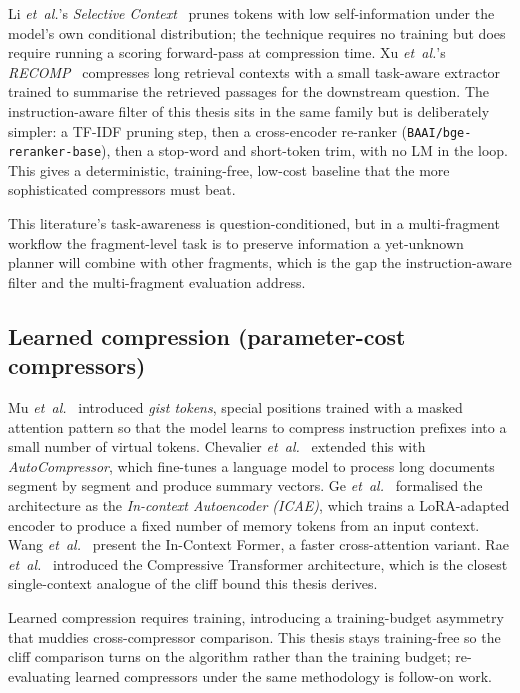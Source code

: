 Li \emph{et~al.}'s \emph{Selective
Context}~\cite{li2023selective} prunes tokens
with low self-information under the model's own conditional
distribution; the technique requires no training but does
require running a scoring forward-pass at compression time. Xu
\emph{et~al.}'s \emph{RECOMP}~\cite{xu2024recomp} compresses long retrieval contexts
with a small task-aware extractor trained to summarise the
retrieved passages for the downstream question. The
instruction-aware filter of this thesis sits in the same family
but is deliberately simpler: a TF-IDF pruning step, then a
cross-encoder re-ranker (\texttt{BAAI/bge-reranker-base}), then a
stop-word and short-token trim, with no LM in the loop. This gives a
deterministic, training-free, low-cost baseline that the more
sophisticated compressors must beat.

This literature's task-awareness is
question-conditioned, but in a multi-fragment workflow the
fragment-level task is to preserve information a yet-unknown planner
will combine with other fragments, which is the gap the instruction-aware
filter and the multi-fragment evaluation address.

\subsection{Learned compression (parameter-cost compressors)}

Mu \emph{et~al.}~\cite{mu2023gist} introduced \emph{gist tokens},
special positions trained with a masked attention pattern so that
the model learns to compress instruction prefixes into a small
number of virtual tokens. Chevalier
\emph{et~al.}~\cite{chevalier2023autocompressor} extended this
with \emph{AutoCompressor}, which fine-tunes a language model to
process long documents segment by segment and produce summary
vectors. Ge \emph{et~al.}~\cite{ge2024icae} formalised the
architecture as the \emph{In-context Autoencoder (ICAE)}, which
trains a LoRA-adapted encoder to produce a fixed number of
memory tokens from an input context. Wang
\emph{et~al.}~\cite{wang2024icf} present the In-Context Former,
a faster cross-attention variant. Rae
\emph{et~al.}~\cite{rae2020compressive} introduced the
Compressive Transformer architecture, which is the closest
single-context analogue of the cliff bound this thesis derives.

Learned compression requires training,
introducing a training-budget asymmetry that muddies
cross-compressor comparison. This thesis stays training-free so the
cliff comparison turns on the algorithm rather than the training
budget; re-evaluating learned compressors under the same methodology
is follow-on work.

